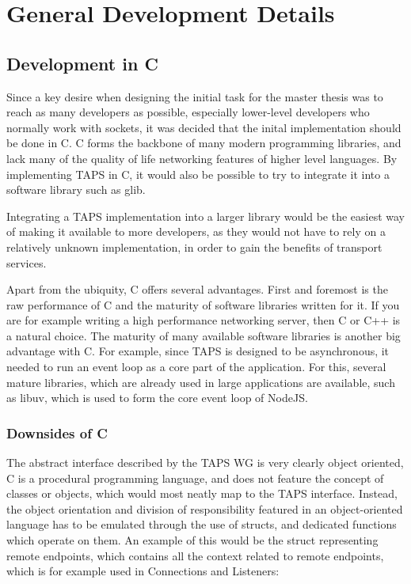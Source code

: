 


\chapter{General Development Details} \label{planningTheProject}
\section{Development in C}
Since a key desire when designing the initial task for
the master thesis was to reach as many developers as possible,
especially lower-level developers who normally work with sockets,
it was decided that the inital implementation should be done in C.
C forms the backbone of many modern programming libraries, and lack
many of the quality of life networking features of higher level languages.
By implementing TAPS in C, it would also be possible to try to integrate it
into a software library such as glib. 

Integrating a TAPS implementation into a larger library would be the easiest
way of making it available to more developers, as they would not have to
rely on a relatively unknown implementation, in order to gain the benefits
of transport services.

Apart from the ubiquity, C offers several advantages. First and foremost
is the raw performance of C and the maturity of software libraries written
for it. If you are for example writing a high performance networking server,
then C or C++ is a natural choice. The maturity of many available software libraries is
another big advantage with C. For example, since TAPS is designed to be asynchronous,
it needed to run an event loop as a core part of the application. For this,
several mature libraries, which are already used in large applications are
available, such as libuv, which is used to form the core event loop of NodeJS. \cite{Libuv2025}

\subsection{Downsides of C}
The abstract interface described by the TAPS WG is very clearly object
oriented, C is a procedural programming language, and does not feature
the concept of classes or objects, which would most neatly map to the
TAPS interface. Instead, the object orientation and division of responsibility
featured in an object-oriented language has to be emulated through the use of
structs, and dedicated functions which operate on them. An example of this
would be the struct representing remote endpoints, which contains all the
context related to remote endpoints, which is for example used
in Connections and Listeners:

